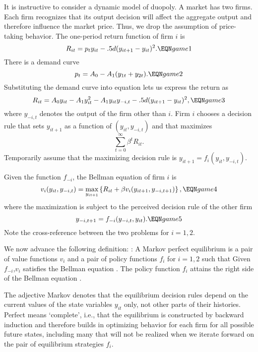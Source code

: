 It is instructive to consider a dynamic model of duopoly.
A  market has two firms. Each firm recognizes that its
output decision will affect the aggregate output and therefore influence the
market price. Thus, we drop the assumption of price-taking behavior.
The  one-period return
function of firm $i$ is
$$ R_{it} = p_t y_{it} - .5 d (y_{i t+1} - y_{it})^2.  \EQN game1 $$
There is a demand curve
$$ p_t = A_0 - A_1 (y_{1t} +  y_{2t}) .  \EQN game2 $$
Substituting the demand curve into equation  lets us express
the return as
$$ R_{it} = A_0 y_{it} - A_1 y_{it}^2 - A_1 y_{it}y_{-i,t}
     - .5 d (y_{it+1} - y_{it})^2 , \EQN game3 $$
where $y_{-i,t}$ denotes the output of the firm other than $i$.
Firm $i$  chooses a decision rule that sets
$y_{it+1}$ as a function of $(y_{it}, y_{-i,t})$  and that  maximizes
$$ \sum_{t=0}^\infty \beta^t R_{it} .$$
Temporarily assume that  the maximizing
decision rule is $y_{it+1}  = f_i(y_{it}, y_{-i,t})$.


Given the function $f_{-i}$, the Bellman equation
of firm $i$ is
$$ v_i(y_{it}, y_{-i,t}) = \max_{y_{it+1}} \left\{
    R_{it} + \beta v_i(y_{it+1}, y_{-i,t+1}) \right\},  \EQN game4 $$
where the maximization is subject to the perceived
decision rule of the other firm
$$ y_{-i,t+1} = f_{-i}(y_{-i,t}, y_{it}). \EQN game5 $$
Note the cross-reference between the two problems for $i=1,2$.

We now advance  the following definition:
\medskip
{}:
 A Markov perfect equilibrium is a  pair of  value
functions $v_i$ and a pair of policy functions
$f_i$ for $i=1,2$ such that
\medskip
{} Given $f_{-i}$,$v_i$ satisfies
the Bellman equation  .
\medskip
{}  The policy function $f_i$ attains the right side
of the Bellman equation .
\medskip

  The adjective Markov denotes that the equilibrium decision
rules depend on the current values of the state variables
$y_{it}$ only, not other parts of their histories.   Perfect means `complete', i.e., that
the equilibrium is constructed by backward induction and therefore
builds in optimizing behavior for each firm for all possible
future states, including many that will  not be realized when we iterate
 forward on the pair of equilibrium
strategies $f_i$.

